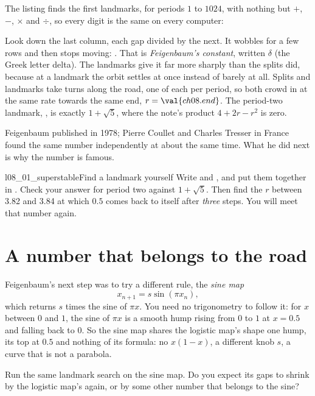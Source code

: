 \noindent
The listing finds the first  landmarks, for periods
$1$ to $1024$, with nothing but $+$, $-$, $\times$ and $\div$, so every digit
is the same on every computer:


\noindent
Look down the last column, each gap divided by the next. It wobbles for a
few rows and then stops moving: . That is
\emph{Feigenbaum's constant}, written $\delta$ (the Greek letter delta). The
landmarks give it far more sharply than the splits did, because at a
landmark the orbit settles at once instead of barely at all. Splits and
landmarks take turns along the road, one of each per period, so both crowd
in at the same rate towards the same end, $r = \val{ch08.end}$. The
period-two landmark, , is exactly $1 + \sqrt{5}$, where
the note's product $4 + 2r - r^{2}$ is zero.

Feigenbaum published in 1978; Pierre Coullet and Charles Tresser in France
found the same number independently at about the same time. What he did
next is why the number is famous.

\begin{lab}{l08_01_superstable}{Find a landmark yourself}
Write  and , and put them together in
. Check your answer for period two against
$1 + \sqrt{5}$. Then find the $r$ between \num{3.82} and \num{3.84} at which
$\num{0.5}$ comes back to itself after \emph{three} steps. You will meet
that number again.
\end{lab}

\section{A number that belongs to the road}
\label{sec:ch08-universal}

\noindent
Feigenbaum's next step was to try a different rule, the \emph{sine map}
\[ x_{n+1} = s \sin(\pi x_{n}), \]
which returns $s$ times the sine of $\pi x$. You need no trigonometry to
follow it: for $x$ between $0$ and $1$, the sine of $\pi x$ is a smooth hump
rising from $0$ to $1$ at $x = \num{0.5}$ and falling back to $0$. So the
sine map shares the logistic map's shape \dash{} one hump, its top at
$\num{0.5}$ \dash{} and nothing of its formula: no $x(1 - x)$, a different
knob $s$, a curve that is not a parabola.

\begin{think}
Run the same landmark search on the sine map. Do you expect its gaps to
shrink by the logistic map's  again, or by some other number
that belongs to the sine?
\end{think}

